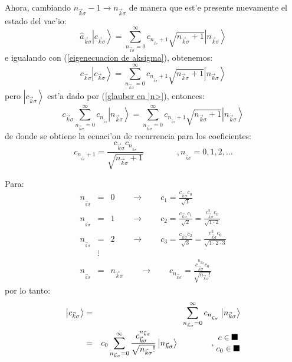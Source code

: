 Ahora, cambiando $n_{\vec{k}\sigma}-1\rightarrow n_{\vec{k}\sigma}$ de manera
que est'e presente nuevamente el estado del vac'io:%
\begin{equation}
\hat{a}_{\vec{k}\sigma}\left| c_{\vec{k}\sigma}\right>
=\sum_{n_{\vec{k}\sigma}=0}^{\infty}c_{n_{_{\vec{k}\sigma}}+1}\sqrt{n_{\vec
{k}\sigma}+1}\left| n_{\vec{k}\sigma}\right>
\end{equation}
e igualando con (\ref{eigenecuacion de aksigma}), obtenemos:%
\begin{equation}
c_{\vec{k}\sigma}\left| c_{\vec{k}\sigma}\right> =\sum_{n_{\vec
{k}\sigma}=0}^{\infty}c_{n_{_{\vec{k}\sigma}}+1}\sqrt{n_{\vec{k}\sigma}%
+1}\left| n_{\vec{k}\sigma}\right>
\end{equation}
pero $\left| c_{\vec{k}\sigma}\right> $ est'a dado por
(\ref{glauber en |n>}), entonces:%
\begin{equation}
c_{\vec{k}\sigma}\sum_{n_{\vec{k}\sigma}=0}^{\infty}c_{n_{_{\vec{k}\sigma}}%
}\left| n_{\vec{k}\sigma}\right> =\sum_{n_{\vec{k}\sigma}=0}%
^{\infty}c_{n_{_{\vec{k}\sigma}}+1}\sqrt{n_{\vec{k}\sigma}+1}\left|
n_{\vec{k}\sigma}\right>
\end{equation}
de donde se obtiene la ecuaci'on de recurrencia para los coeficientes:%
\begin{equation}
c_{n_{_{\vec{k}\sigma}}+1}=\frac{c_{\vec{k}\sigma}c_{n_{_{\vec{k}\sigma}}}%
}{\sqrt{n_{\vec{k}\sigma}+1}}\qquad\qquad,n_{_{\vec{k}\sigma}}=0,1,2,\dots
\end{equation}


Para:%
\begin{eqnarray}
n_{_{\vec{k}\sigma}} & = &0\qquad\rightarrow\qquad c_{1}=\frac{c_{\vec{k}%
\sigma}c_{0}}{\sqrt{1}}\\
n_{_{\vec{k}\sigma}} & = &1\qquad\rightarrow\qquad c_{2}=\frac{c_{\vec{k}%
\sigma}c_{1}}{\sqrt{2}}=\frac{c_{\vec{k}\sigma}^{2}c_{0}}{\sqrt{1\cdot2}}\\
n_{_{\vec{k}\sigma}} & = &2\qquad\rightarrow\qquad c_{3}=\frac{c_{\vec{k}%
\sigma}c_{2}}{\sqrt{3}}=\frac{c_{\vec{k}\sigma}^{3}c_{0}}{\sqrt{1\cdot2\cdot
3}}\\
& \vdots\\
n_{_{\vec{k}\sigma}} & = &n_{\vec{k}\sigma}\qquad\rightarrow\qquad
c_{n_{\vec{k}\sigma}}=\frac{c_{\vec{k}\sigma}^{n_{\vec{k}\sigma}}c_{0}}%
{\sqrt{n_{\vec{k}\sigma}!}}%
\end{eqnarray}
por lo tanto:%
\begin{eqnarray}
\left| c_{\vec{k}\sigma}\right> & = &\sum_{n_{\vec{k}\sigma}%
=0}^{\infty}c_{n_{_{\vec{k}\sigma}}}\left| n_{\vec{k}\sigma}\right>
\\
& = &c_{0}\sum_{n_{\vec{k}\sigma}=0}^{\infty}\frac{c_{\vec{k}\sigma}^{n_{\vec
{k}\sigma}}}{\sqrt{n_{\vec{k}\sigma}!}}\left| n_{\vec{k}\sigma
}\right> \qquad\qquad,%
\genfrac{.}{.}{0pt}{}{c\in\protect\rule{0.1in}{0.1in} }{c_{0}\in
\protect\rule{0.1in}{0.1in} }%
\end{eqnarray}


